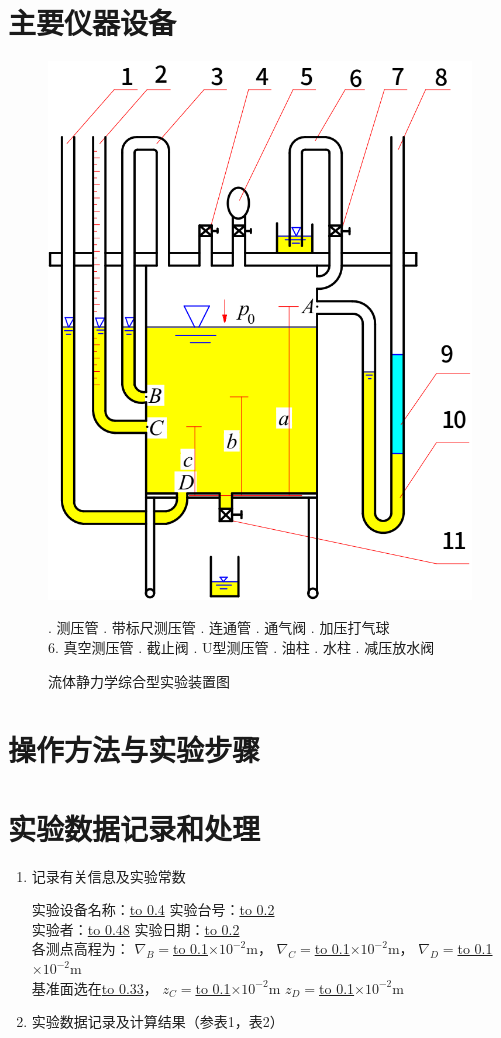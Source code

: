 \documentclass[UTF8,AutoFakeBold,a4paper]{article}  %
\begin{document}
    \section{主要仪器设备}
    \begin{figure}[H]
        \centering 
        \includegraphics[width=0.4\linewidth]{figures/exp1.png}
        \caption{流体静力学综合型实验装置图}
        \par
        {. 测压管 . 带标尺测压管 . 连通管 . 通气阀 . 加压打气球 \\ 
        6. 真空测压管 . 截止阀 . U型测压管 . 油柱 . 水柱 . 减压放水阀 \par}
    \end{figure}        
    \section{操作方法与实验步骤}
    \section{实验数据记录和处理}
    \begin{enumerate}
        \linespread{1.5}
        \item 记录有关信息及实验常数
        \par 
        实验设备名称：\underline{\hbox to 0.4\linewidth{\hfill \hfill}}
        实验台号：\underline{\hbox to 0.2\linewidth{\hfill \hfill}} \\ 
        实验者：\underline{\hbox to 0.48\linewidth{\hfill \hfill}}
        实验日期：\underline{\hbox to 0.2\linewidth{\hfill \hfill}} \\ 
        各测点高程为：
        $ \nabla_{B}= $\underline{\hbox to 0.1\linewidth{\hfill \hfill}}$ \times10^{-2}\mathrm{m} $，
        $ \nabla_{C}= $\underline{\hbox to 0.1\linewidth{\hfill \hfill}}$ \times10^{-2}\mathrm{m} $，
        $ \nabla_{D}= $\underline{\hbox to 0.1\linewidth{\hfill \hfill}}$ \times10^{-2}\mathrm{m} $ \\ 
        基准面选在\underline{\hbox to 0.33\linewidth{\hfill \hfill}}，
        $ z_{C}= $\underline{\hbox to 0.1\linewidth{\hfill \hfill}}$ \times10^{-2}\mathrm{m} $
        $ z_{D}= $\underline{\hbox to 0.1\linewidth{\hfill \hfill}}$ \times10^{-2}\mathrm{m} $
        \item 实验数据记录及计算结果（参表1，表2）
    \end{enumerate}
\end{document}
